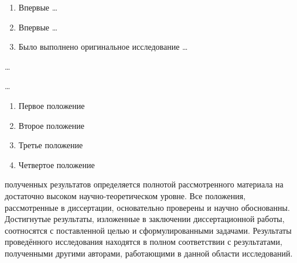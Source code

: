 {\novelty}
\begin{enumerate}[beginpenalty=10000] %
  \item Впервые \ldots
  \item Впервые \ldots
  \item Было выполнено оригинальное исследование \ldots
\end{enumerate}

{\influence} \ldots

{\methods} \ldots

{}
\begin{enumerate}[beginpenalty=10000] %
  \item Первое положение
  \item Второе положение
  \item Третье положение
  \item Четвертое положение
\end{enumerate}

{\reliability} полученных результатов определяется полнотой рассмотренного материала на достаточно высоком научно-теоретическом уровне. Все положения,  рассмотренные в диссертации, основательно проверены и научно обоснованны. Достигнутые результаты, изложенные в заключении диссертационной работы, соотносятся с поставленной целью и сформулированными задачами. Результаты проведённого исследования находятся в полном соответствии с результатами, полученными другими авторами, работающими в данной области исследований.


